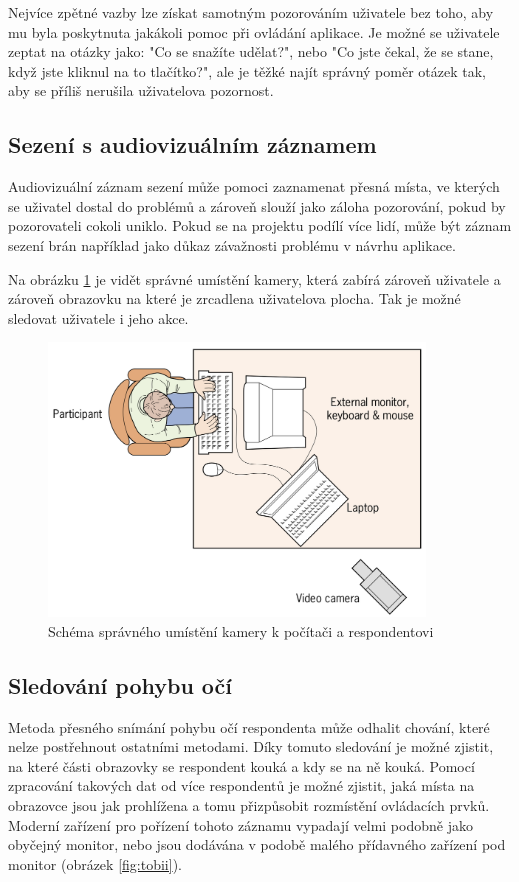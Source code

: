 Nejvíce zpětné vazby lze získat samotným pozorováním uživatele bez toho, aby mu byla poskytnuta jakákoli pomoc při ovládání aplikace. Je možné se uživatele zeptat na otázky jako: "Co se snažíte udělat?", nebo "Co jste čekal, že se stane, když jste kliknul na to tlačítko?", ale je těžké najít správný poměr otázek tak, aby se příliš nerušila uživatelova pozornost\cite{stone2005user}.

\subsection{Sezení s audiovizuálním záznamem}
Audiovizuální záznam sezení může pomoci zaznamenat přesná místa, ve kterých se uživatel dostal do problémů a zároveň slouží jako záloha pozorování, pokud by pozorovateli cokoli uniklo. Pokud se na projektu podílí více lidí, může být záznam sezení brán například jako důkaz závažnosti problému v návrhu aplikace.\cite{stone2005user}

Na obrázku \ref{fig:testing-camera} je vidět správné umístění kamery, která zabírá zároveň uživatele a zároveň obrazovku na které je zrcadlena uživatelova plocha. Tak je možné sledovat uživatele i jeho akce.\cite{stone2005user}

\begin{figure}[htb]
\begin{center}
\includegraphics[width=100mm]{./pictures/testing-camera.png}
\caption{Schéma správného umístění kamery k počítači a respondentovi\cite{stone2005user}}
\label{fig:testing-camera}
\end{center}
\end{figure}

\subsection{Sledování pohybu očí}
Metoda přesného snímání pohybu očí respondenta může odhalit chování, které nelze postřehnout ostatními metodami. Díky tomuto sledování je možné zjistit, na které části obrazovky se respondent kouká a kdy se na ně kouká. Pomocí zpracování takových dat od více respondentů je možné zjistit, jaká místa na obrazovce jsou jak prohlížena a tomu přizpůsobit rozmístění ovládacích prvků. Moderní zařízení pro pořízení tohoto záznamu vypadají velmi podobně jako obyčejný monitor, nebo jsou dodávána v podobě malého přídavného zařízení pod monitor (obrázek \ref{fig:tobii}).

